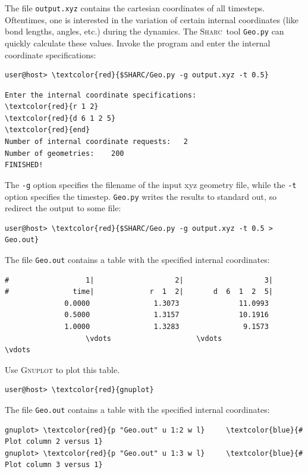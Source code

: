 \documentclass[a4paper,11pt,DIV=15,openany]{scrbook}
\newcommand{\sharc}{\textsc{Sharc}}
\newcommand{\ttt}[1]{\texttt{#1}}
\begin{document}
The file \ttt{output.xyz} contains the cartesian coordinates of all timesteps. Oftentimes, one is interested in the variation of certain internal coordinates (like bond lengths, angles, etc.) during the dynamics. The \sharc\ tool \ttt{Geo.py} can quickly calculate these values. Invoke the program and enter the internal coordinate specifications:
\begin{Verbatim}[commandchars=\\\{\}]
user@host> \textcolor{red}{$SHARC/Geo.py -g output.xyz -t 0.5}
\end{Verbatim}

\begin{oframed}
\footnotesize\begin{Verbatim}[commandchars=\\\{\}]
Enter the internal coordinate specifications:
\textcolor{red}{r 1 2}
\textcolor{red}{d 6 1 2 5}
\textcolor{red}{end}
Number of internal coordinate requests:   2
Number of geometries:    200
FINISHED!
\end{Verbatim}
\end{oframed}

\normalsize
The \ttt{-g} option specifies the filename of the input xyz geometry file, while the \ttt{-t} option specifies the timestep. \ttt{Geo.py} writes the results to standard out, so redirect the output to some file:
\begin{Verbatim}[commandchars=\\\{\}]
user@host> \textcolor{red}{$SHARC/Geo.py -g output.xyz -t 0.5 > Geo.out}
\end{Verbatim}
The file \ttt{Geo.out} contains a table with the specified internal coordinates:
\begin{oframed}
\footnotesize\begin{Verbatim}[commandchars=\\\{\}]
#                  1|                   2|                   3|
#               time|             r  1  2|       d  6  1  2  5|
              0.0000               1.3073              11.0993 
              0.5000               1.3157              10.1916 
              1.0000               1.3283               9.1573 
                   \vdots                    \vdots                    \vdots
\end{Verbatim}
\end{oframed}

Use \textsc{Gnuplot} to plot this table. 
\begin{Verbatim}[commandchars=\\\{\}]
user@host> \textcolor{red}{gnuplot}
\end{Verbatim}
The file \ttt{Geo.out} contains a table with the specified internal coordinates:
\begin{oframed}
\footnotesize\begin{Verbatim}[commandchars=\\\{\}]
gnuplot> \textcolor{red}{p "Geo.out" u 1:2 w l}     \textcolor{blue}{# Plot column 2 versus 1}
gnuplot> \textcolor{red}{p "Geo.out" u 1:3 w l}     \textcolor{blue}{# Plot column 3 versus 1}
\end{Verbatim}
\end{oframed}
\end{document}
